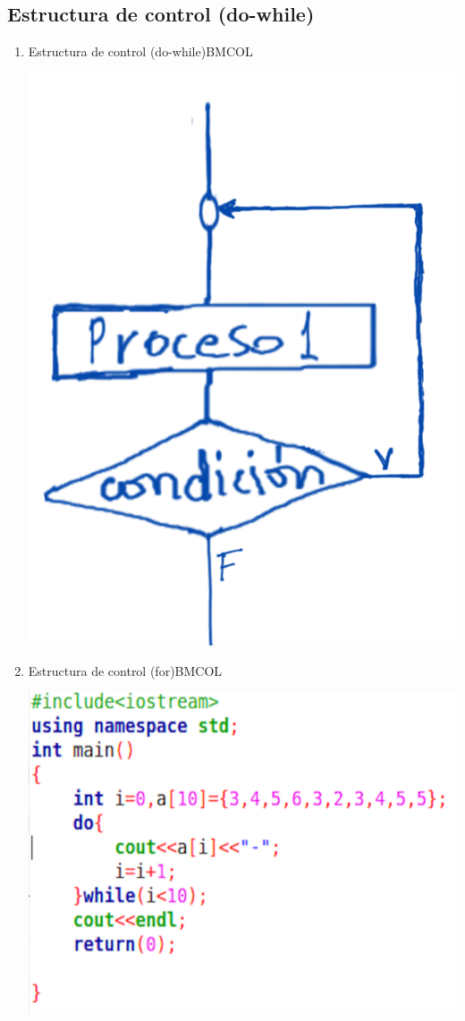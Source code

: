 \documentclass[presentation, aspectratio=54]{beamer}
\begin{document}
\subsection{Estructura de control (do-while)}
\label{sec:orgcf497e4}
\begin{enumerate}
\item Estructura de control (do-while)\hfill{}\textsc{BMCOL}
\label{sec:orgd31e415}
\begin{center}
\includegraphics[width=.9\linewidth]{./images/codigo/dowhile.png}
\end{center}
\item Estructura de control (for)\hfill{}\textsc{BMCOL}
\label{sec:org72ed1f2}
\begin{center}
\includegraphics[width=.9\linewidth]{./images/codigo/code-dowhile.png}
\end{center}
\end{enumerate}
\end{document}
